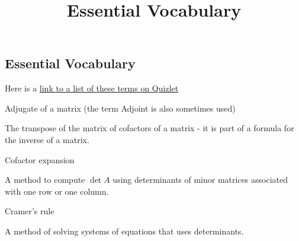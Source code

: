 \documentclass{ximera}
\title{Essential Vocabulary} \license{CC BY-NC-SA 4.0}
\begin{document}
\begin{abstract}
\end{abstract}
\maketitle


\begin{onlineOnly}
\section*{Essential Vocabulary}
Here is a  \href{https://quizlet.com/906039813/chapter-7-vocabulary-flash-cards/?i=y06sd&x=1jqt}{link to a list of these terms on Quizlet}
\end{onlineOnly}


Adjugate of a matrix (the term Adjoint is also sometimes used)
\begin{expandable}
    The transpose of the matrix of cofactors of a matrix - it is part of a formula for the inverse of a matrix.
\end{expandable}


Cofactor expansion
\begin{expandable}
    A method to compute $\det A$ using determinants of minor matrices associated with one row or one column.
\end{expandable}


Cramer's rule
\begin{expandable}
    A method of solving systems of equations that uses determinants.
\end{expandable}

\end{document}
